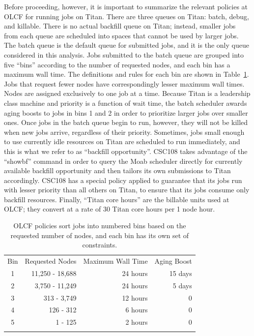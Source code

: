 Before proceeding, however, it is important to summarize the relevant policies
at OLCF for running jobs on Titan. There are three queues on Titan: batch,
debug, and killable. There is no actual backfill queue on Titan; instead,
smaller jobs from each queue are scheduled into spaces that cannot be used by
larger jobs. The batch queue is the default queue for submitted jobs, and it is
the only queue considered in this analysis. Jobs submitted to the batch queue
are grouped into five ``bins'' according to the number of requested nodes, and
each bin has a maximum wall time. The definitions and rules for each bin are
shown in Table~\ref{tab:olcf-bins}. Jobs that request fewer nodes have
correspondingly lesser maximum wall times. Nodes are assigned exclusively to
one job at a time. Because Titan is a leadership class machine and priority is
a function of wait time, the batch scheduler awards aging boosts to jobs in
bins 1 and 2 in order to prioritize larger jobs over smaller ones. Once jobs in
the batch queue begin to run, however, they will not be killed when new jobs
arrive, regardless of their priority. Sometimes, jobs small enough to use
currently idle resources on Titan are scheduled to run immediately, and this is
what we refer to as ``backfill opportunity''. CSC108 takes advantage of the
``showbf'' command in order to query the Moab scheduler directly for currently
available backfill opportunity and then tailors its own submissions to Titan
accordingly. CSC108 has a special policy applied to guarantee that its jobs run
with lesser priority than all others on Titan, to ensure that its jobs consume
only backfill resources. Finally, ``Titan core hours'' are the billable units
used at OLCF; they convert at a rate of 30 Titan core hours per 1 node hour.

\begin{table}
\caption{OLCF policies sort jobs into numbered bins based on the requested
number of nodes, and each bin has its own set of constraints.}
\label{tab:olcf-bins}       %
\begin{tabular}{crrr}
\hline\noalign{\smallskip}
Bin & Requested Nodes   & Maximum Wall Time &   Aging Boost \\
\noalign{\smallskip}\hline\noalign{\smallskip}
1   &   11,250 - 18,688 &   24 hours        &   15 days     \\
2   &    3,750 - 11,249 &   24 hours        &    5 days     \\
3   &       313 - 3,749 &   12 hours        &         0     \\
4   &         126 - 312 &    6 hours        &         0     \\
5   &           1 - 125 &    2 hours        &         0     \\
\noalign{\smallskip}\hline
\end{tabular}
\end{table}

